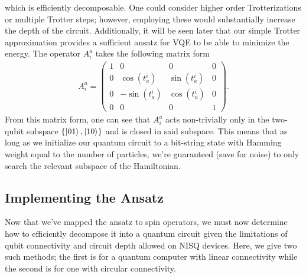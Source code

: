 \documentclass[10pt]{article}
\begin{document}
which is efficiently decomposable. One could consider higher order Trotterizations or multiple Trotter steps; however, employing these would substantially increase the depth of the circuit. Additionally, it will be seen later that our simple Trotter approximation provides a sufficient ansatz for VQE to be able to minimize the energy. The operator $A^a_i$ takes the following matrix form
\begin{align}
A^a_i
=
\begin{pmatrix}
1 & 0 & 0 & 0 \\
0 & \cos(t^i_a) & \sin(t^i_a) & 0 \\
0 & -\sin(t^i_a) & \cos(t^i_a) & 0 \\
0 & 0 & 0 & 1
\end{pmatrix}
.\end{align}
From this matrix form, one can see that $A^a_i$ acts non-trivially only in the two-qubit subspace $\{\ket{01},\ket{10}\}$ and is closed in said subspace. This means that as long as we initialize our quantum circuit to a bit-string state with Hamming weight equal to the number of particles, we're guaranteed (save for noise) to only search the relevant subspace of the Hamiltonian.

\subsection{Implementing the Ansatz}

Now that we've mapped the ansatz to spin operators, we must now determine how to efficiently decompose it into a quantum circuit given the limitations of qubit connectivity and circuit depth allowed on NISQ devices. Here, we give two such methods; the first is for a quantum computer with linear connectivity while the second is for one with circular connectivity. 
\end{document}
